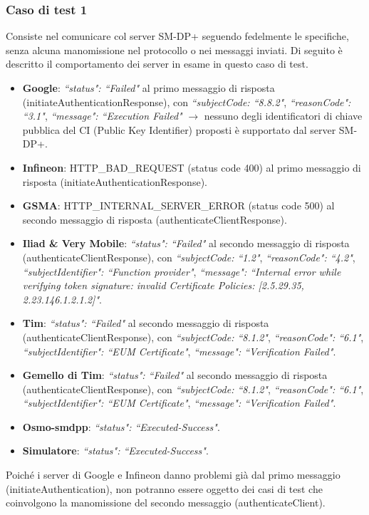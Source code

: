 \documentclass[10pt, oneside]{book}
\begin{document}
\subsubsection{Caso di test 1}
Consiste nel comunicare col server SM-DP+ seguendo fedelmente le specifiche, senza alcuna manomissione nel protocollo o nei messaggi inviati. Di seguito è descritto il comportamento dei server in esame in questo caso di test.
\begin{itemize}
\item \textbf{Google}: \textit{``status": ``Failed"} al primo messaggio di risposta (initiateAuthenticationResponse), con \textit{``subjectCode: ``8.8.2"}, \textit{``reasonCode": ``3.1"}, \textit{``message": ``Execution Failed"} $\rightarrow$ nessuno degli identificatori di chiave pubblica del CI (Public Key Identifier) proposti è supportato dal server SM-DP+.
\item \textbf{Infineon}: HTTP\_BAD\_REQUEST (status code 400) al primo messaggio di risposta (initiateAuthenticationResponse).
\item \textbf{GSMA}: HTTP\_INTERNAL\_SERVER\_ERROR (status code 500) al secondo messaggio di risposta (authenticateClientResponse).
\item \textbf{Iliad \& Very Mobile}: \textit{``status": ``Failed"} al secondo messaggio di risposta (authenticateClientResponse), con \textit{``subjectCode: ``1.2"}, \textit{``reasonCode": ``4.2"}, \textit{``subjectIdentifier": ``Function provider"}, \textit{``message": ``Internal error while verifying token signature: invalid Certificate Policies: [2.5.29.35, 2.23.146.1.2.1.2]"}.
\item \textbf{Tim}: \textit{``status": ``Failed"} al secondo messaggio di risposta (authenticateClientResponse), con \textit{``subjectCode: ``8.1.2"}, \textit{``reasonCode": ``6.1"}, \textit{``subjectIdentifier": ``EUM Certificate"}, \textit{``message": ``Verification Failed"}.
\item \textbf{Gemello di Tim}: \textit{``status": ``Failed"} al secondo messaggio di risposta (authenticateClientResponse), con \textit{``subjectCode: ``8.1.2"}, \textit{``reasonCode": ``6.1"}, \textit{``subjectIdentifier": ``EUM Certificate"}, \textit{``message": ``Verification Failed"}.
\item \textbf{Osmo-smdpp}: \textit{``status": ``Executed-Success"}.
\item \textbf{Simulatore}: \textit{``status": ``Executed-Success"}.
\end{itemize}
Poiché i server di Google e Infineon danno problemi già dal primo messaggio (initiateAuthentication), non potranno essere oggetto dei casi di test che coinvolgono la manomissione del secondo messaggio (authenticateClient).
\end{document}

